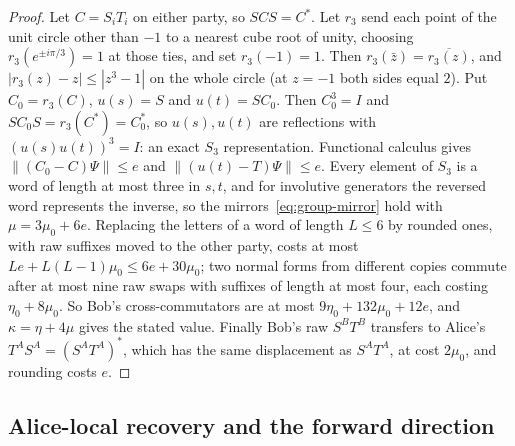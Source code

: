 \begin{proof}
Let $C=S_iT_i$ on either party, so $SCS=C^*$. Let $r_3$ send each point of the unit circle other than $-1$ to a nearest
cube root of unity, choosing $r_3(e^{\pm i\pi/3})=1$ at those ties, and set $r_3(-1)=1$. Then $r_3(\bar z)=\overline{r_3(z)}$,
and $|r_3(z)-z|\le|z^3-1|$ on the whole circle (at $z=-1$ both sides equal $2$). Put $C_0=r_3(C)$, $u(s)=S$ and $u(t)=SC_0$. Then $C_0^3=I$ and $SC_0S=r_3(C^*)=C_0^*$, so $u(s),u(t)$ are
reflections with $(u(s)u(t))^3=I$: an exact $S_3$ representation. Functional calculus gives $\|(C_0-C)\Psi\|\le e$ and
$\|(u(t)-T)\Psi\|\le e$. Every element of $S_3$ is a word of length at most three in $s,t$, and for involutive generators
the reversed word represents the inverse, so the mirrors~\eqref{eq:group-mirror} hold with $\mu=3\mu_0+6e$. Replacing the
letters of a word of length $L\le6$ by rounded ones, with raw suffixes moved to the other party, costs at most
$Le+L(L-1)\mu_0\le6e+30\mu_0$; two normal forms from different copies commute after at most nine raw swaps with suffixes
of length at most four, each costing $\eta_0+8\mu_0$. So Bob's cross-commutators are at most $9\eta_0+132\mu_0+12e$, and
$\kappa=\eta+4\mu$ gives the stated value. Finally Bob's raw $S^BT^B$ transfers to Alice's $T^AS^A=(S^AT^A)^*$, which has
the same displacement as $S^AT^A$, at cost $2\mu_0$, and rounding costs $e$.
\end{proof}

\subsection{Alice-local recovery and the forward direction}\label{sec:recovery}

